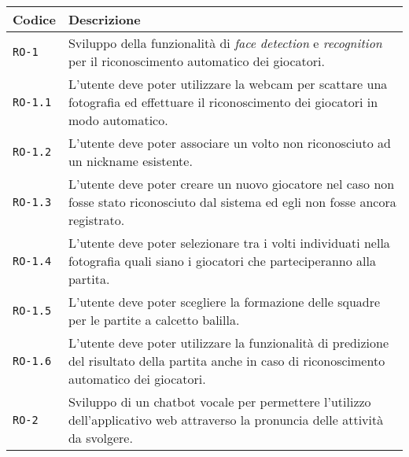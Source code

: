 \begin{center}
	
	\renewcommand{\arraystretch}{1.5}
	
	\centering
	\begin{longtable}{| C{3cm} | L{8.7cm} |}
		
		\hline
		
		\textbf{Codice} &  \textbf{Descrizione} \\
		
		\hline
		
		\texttt{RO-1} & Sviluppo della funzionalità di \emph{face detection} e \emph{recognition} per il riconoscimento automatico dei giocatori. \\
		
		\hline 
		
		\texttt{RO-1.1} & L'utente deve poter utilizzare la webcam per scattare una fotografia ed effettuare il
		riconoscimento dei giocatori in modo automatico. \\
		
		\hline 
		
		\texttt{RO-1.2} & L'utente deve poter associare un volto non riconosciuto ad un nickname esistente. \\
		
		\hline 
		
		\texttt{RO-1.3} & L'utente deve poter creare un nuovo giocatore nel caso non fosse stato riconosciuto dal sistema ed egli non fosse ancora registrato. \\
		
		\hline
		
		\texttt{RO-1.4} & L'utente deve poter selezionare tra i volti individuati nella fotografia quali siano i giocatori che parteciperanno alla partita. \\
		
		\hline 
		
		\texttt{RO-1.5} & L'utente deve poter scegliere la formazione delle squadre per le partite a calcetto balilla. \\
		
		\hline 
		
		\texttt{RO-1.6} & L'utente deve poter utilizzare la funzionalità di predizione del risultato della partita 
		anche in caso di riconoscimento automatico dei giocatori. \\
		
		\hline 
		
		\texttt{RO-2} & Sviluppo di un \gls{chatbot} vocale per permettere l'utilizzo dell'applicativo web attraverso la pronuncia delle attività da svolgere. \\
		

\end{longtable}
\end{center}
